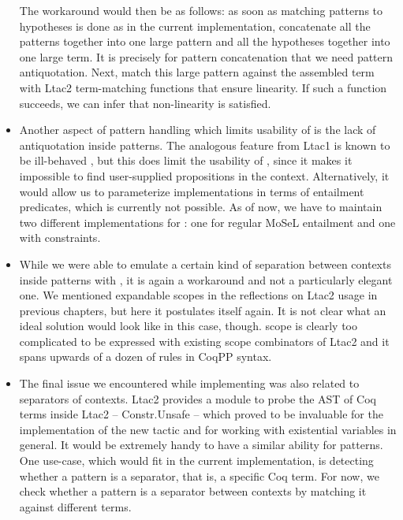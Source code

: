 \begin{itemize}
    The workaround would then be as follows: as soon as matching patterns to hypotheses is done as in the current implementation, concatenate all the patterns together into one large pattern and all the hypotheses together into one large term.
    It is precisely for pattern concatenation that we need pattern antiquotation.
    Next, match this large pattern against the assembled term with Ltac2 term-matching functions that ensure linearity.
    If such a function succeeds, we can infer that non-linearity is satisfied.
\item Another aspect of pattern handling which limits usability of  is the lack of  antiquotation inside patterns.
  The analogous feature from Ltac1 is known to be ill-behaved \cite{PatternEvarValue, MultipleOccurrencesSame}, but this does limit the usability of , since it makes it impossible to find user-supplied propositions in the context.
  Alternatively, it would allow us to parameterize implementations in terms of entailment predicates, which is currently not possible.
  As of now, we have to maintain two different implementations for : one for regular MoSeL entailment and one with constraints.
\item While we were able to emulate a certain kind of separation between contexts inside patterns with \coqe{_ : $\Vert$}, it is again a workaround and not a particularly elegant one.
  We mentioned expandable scopes in the reflections on Ltac2 usage in previous chapters, but here it postulates itself again.
  It is not clear what an ideal solution would look like in this case, though.
   scope is clearly too complicated to be expressed with existing scope combinators of Ltac2 and it spans upwards of a dozen of rules in CoqPP syntax.
\item The final issue we encountered while implementing  was also related to separators of contexts.
  Ltac2 provides a module to probe the AST of Coq terms inside Ltac2 -- Constr.Unsafe -- which proved to be invaluable for the implementation of the new  tactic and for working with existential variables in general.
  It would be extremely handy to have a similar ability for patterns.
  One use-case, which would fit in the current implementation, is detecting whether a pattern is a separator, that is, a specific Coq term.
  For now, we check whether a pattern is a separator between contexts by matching it against different terms.
\end{itemize}

